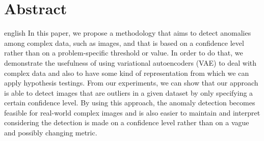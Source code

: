 \chapter*{Abstract}             %
\label{chap:abstract}           %

\begin{otherlanguage*}{english}
In this paper, we propose a methodology that aims to detect anomalies among complex data, such as images, and that is based on a confidence level rather than on a problem-specific threshold or value. In order to do that, we demonstrate the usefulness of using variational autoencoders (VAE) to deal with complex data and also to have some kind of representation from which we can apply hypothesis testings. From our experiments, we can show that our approach is able to detect images that are outliers in a given dataset by only specifying a certain confidence level. By using this approach, the anomaly detection becomes feasible for real-world complex images and is also easier to maintain and interpret considering the detection is made on a confidence level rather than on a vague and possibly changing metric.
\end{otherlanguage*}

